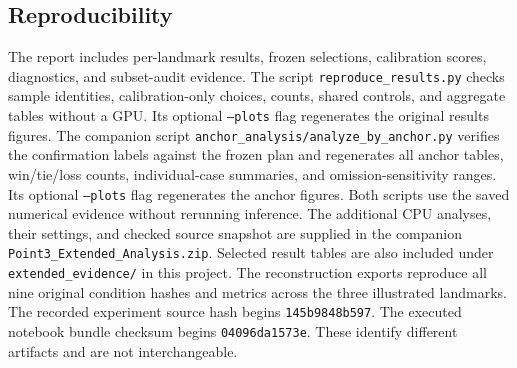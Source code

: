 \subsection{Reproducibility}
The report includes per-landmark results, frozen selections, calibration scores, diagnostics, and subset-audit evidence. The script \nolinkurl{reproduce_results.py} checks sample identities, calibration-only choices, counts, shared controls, and aggregate tables without a GPU. Its optional \texttt{--plots} flag regenerates the original results figures. The companion script \nolinkurl{anchor_analysis/analyze_by_anchor.py} verifies the confirmation labels against the frozen plan and regenerates all anchor tables, win/tie/loss counts, individual-case summaries, and omission-sensitivity ranges. Its optional \texttt{--plots} flag regenerates the anchor figures. Both scripts use the saved numerical evidence without rerunning inference. The additional CPU analyses, their settings, and checked source snapshot are supplied in the companion \nolinkurl{Point3_Extended_Analysis.zip}. Selected result tables are also included under \nolinkurl{extended_evidence/} in this project. The reconstruction exports reproduce all nine original condition hashes and metrics across the three illustrated landmarks. The recorded experiment source hash begins \texttt{145b9848b597}. The executed notebook bundle checksum begins \texttt{04096da1573e}. These identify different artifacts and are not interchangeable.
